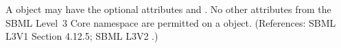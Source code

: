 A \ListOfEventAssignments object may have the optional attributes
  and .  No other attributes from the SBML
Level~3 Core namespace are permitted on a \ListOfEventAssignments object.
(References: SBML L3V1 Section 4.12.5; SBML L3V2 .)
